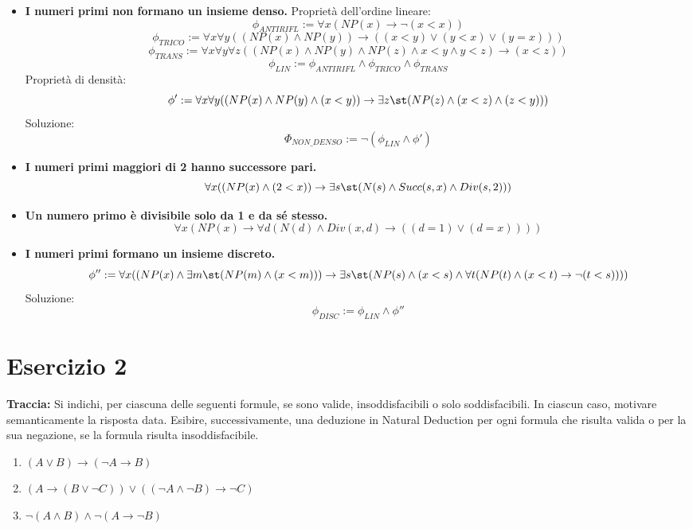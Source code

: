 \begin{itemize}
    \item[(a)] \textbf{I numeri primi non formano un insieme denso.}
    Proprietà dell'ordine lineare:
    \[ \phi_{ANTIRIFL} := \forall x (NP(x) \to \neg(x < x)) \]
    \[ \phi_{TRICO} := \forall x \forall y ((NP(x) \land NP(y)) \to ((x < y) \lor (y < x) \lor (y = x))) \]
    \[ \phi_{TRANS} := \forall x \forall y \forall z ((NP(x) \land NP(y) \land NP(z) \land x < y \land y < z) \to (x < z)) \]
    \[ \phi_{LIN} := \phi_{ANTIRIFL} \land \phi_{TRICO} \land \phi_{TRANS} \]
    Proprietà di densità:
    \[ \phi' := \forall x \forall y ((NP(x) \land NP(y) \land (x < y)) \to \exists z \st (NP(z) \land (x < z) \land (z < y))) \]
    Soluzione:
    \[ \Phi_{NON\_DENSO} := \neg(\phi_{LIN} \land \phi') \]

    \item[(b)] \textbf{I numeri primi maggiori di 2 hanno successore pari.}
    \[ \forall x ((NP(x) \land (2 < x)) \to \exists s \st (N(s) \land Succ(s, x) \land Div(s, 2))) \]

    \item[(c)] \textbf{Un numero primo è divisibile solo da 1 e da sé stesso.}
    \[ \forall x (NP(x) \to \forall d (N(d) \land Div(x, d) \to ((d = 1) \lor (d = x)))) \]

    \item[(d)] \textbf{I numeri primi formano un insieme discreto.}
    \[ \phi'' := \forall x ((NP(x) \land \exists m \st (NP(m) \land (x < m))) \to \exists s \st (NP(s) \land (x < s) \land \forall t (NP(t) \land (x < t) \to \neg(t < s)))) \]
    Soluzione:
    \[ \phi_{DISC} := \phi_{LIN} \land \phi'' \]
\end{itemize}

\section*{Esercizio 2}
\textbf{Traccia:}
Si indichi, per ciascuna delle seguenti formule, se sono valide, insoddisfacibili o solo soddisfacibili. In ciascun caso, motivare semanticamente la risposta data.
Esibire, successivamente, una deduzione in Natural Deduction per ogni formula che risulta valida o per la sua negazione, se la formula risulta insoddisfacibile.
\begin{enumerate}
    \item[(a)] $(A \lor B) \to (\neg A \to B)$
    \item[(b)] $(A \to (B \lor \neg C)) \lor ((\neg A \land \neg B) \to \neg C)$
    \item[(c)] $\neg(A \land B) \land \neg(A \to \neg B)$
\end{enumerate}

